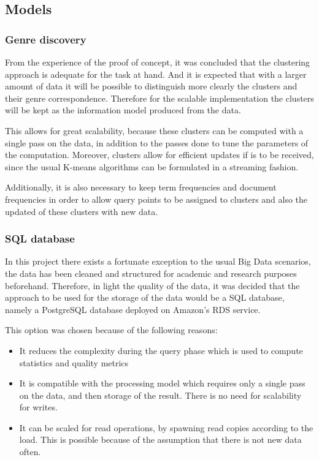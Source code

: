 \documentclass[11pt,a4paper]{scrartcl}
\begin{document}
    \subsection{Models}
    \subsubsection{Genre discovery}
    
    From the experience of the proof of concept, it was concluded that the
    clustering approach is adequate for the task at hand. And it is expected
    that with a larger amount of data it will be possible to distinguish
    more clearly the clusters and their genre correspondence. Therefore
    for the scalable implementation the clusters will be kept as the information
    model produced from the data.
    
    This allows for great scalability, because these clusters can be computed
    with a single pass on the data, in addition to the passes done to tune
    the parameters of the computation. Moreover, clusters allow for efficient
    updates if is to be received, since the usual K-means algorithms can
    be formulated in a streaming fashion.
    
    Additionally, it is also necessary to keep term frequencies and
    document frequencies in order to allow query points to be assigned
    to clusters and also the updated of these clusters with new data.
    
    \subsubsection{SQL database}
    In this project there exists a fortunate exception to the usual Big Data
    scenarios, the data has been cleaned and structured for academic and
    research purposes beforehand. Therefore, in light the quality of the data,
    it was decided that the approach to be used for the storage of the data would
    be a SQL database, namely a PostgreSQL database deployed on Amazon's RDS
    service.
 
    This option was chosen because of the following reasons:
 
    \begin{itemize}
      \item It reduces the complexity during the query phase which is used to
            compute statistics and quality metrics
      \item It is compatible with the processing model which requires only a
            single pass on the data, and then storage of the result. There
            is no need for scalability for writes.
      \item It can be scaled for read operations, by spawning read copies
            according to the load. This is possible because of the assumption
            that there is not new data often.
    \end{itemize}        
 
\end{document}
